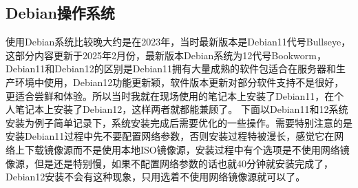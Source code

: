 \subsection{Debian操作系统}
使用Debian系统比较晚大约是在2023年，当时最新版本是Debian11代号Bullseye，这部分内容更新于2025年2月份，最新版本Debian系统为12代号Bookworm，Debian11和Debian12的区别是Debian11拥有大量成熟的软件包适合在服务器和生产环境中使用，Debian12功能更新颖，软件版本更新对部分软件支持不是很好，更适合尝鲜和体验。所以当时我就在现场使用的笔记本上安装了Debian11，在个人笔记本上安装了Debian12，这样两者就都能兼顾了。
下面以Debian11和12系统安装为例子简单记录下，系统安装完成后需要优化的一些操作。需要特别注意的是安装Debian11过程中先不要配置网络参数，否则安装过程特被漫长，感觉它在网络上下载镜像源而不是使用本地ISO镜像源，安装过程中有个选项是不使用网络镜像源，但是还是特别慢，如果不配置网络参数的话也就40分钟就安装完成了，Debian12安装不会有这种现象，只用选着不使用网络镜像源就可以了。
